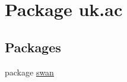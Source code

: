 \hypertarget{namespaceuk_1_1ac}{\section{Package uk.\+ac}
\label{namespaceuk_1_1ac}
}
\subsection*{Packages}
\begin{DoxyCompactItemize}
\item 
package \hyperlink{namespaceuk_1_1ac_1_1swan}{swan}
\end{DoxyCompactItemize}
